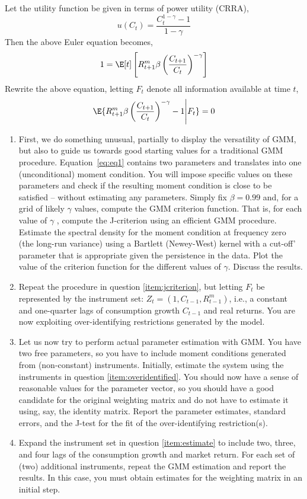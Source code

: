 Let the utility function be given in terms of power utility (CRRA),
\[
    u(C_t) = \frac{C_t^{1-\gamma}-1}{1-\gamma}    
\]
Then the above Euler equation becomes,
\[
    1 = \E[t]\left[R^m_{t+1}\beta\left(\frac{C_{t+1}}{C_t}\right)^{-\gamma}\right]
\]
Rewrite the above equation, letting \(F_t\) denote all information available at time \(t\),
\begin{equation}
    \label{eq:eq1}
    \E{R^m_{t+1}\beta\left(\frac{C_{t+1}}{C_t}\right)^{-\gamma}-1 \Bigg\vert F_t} = 0
\end{equation}
\begin{enumerate}[label = \Alph*)]
    \item \label{item:jcriterion} First, we do something unusual, partially to display the versatility of GMM, but also to guide us towards good starting values for a traditional GMM procedure. Equation~\ref{eq:eq1} contains two parameters and translates into one (unconditional) moment condition. You will impose speciﬁc values on these parameters and check if the resulting moment condition is close to be satisﬁed – without estimating any parameters. Simply ﬁx \(\beta = 0.99\) and, for a grid of likely \(\gamma\) values, compute the GMM criterion function. That is, for each value of \(\gamma\) , compute the J-criterion using an eﬃcient GMM procedure. Estimate the spectral density for the moment condition at frequency zero (the long-run variance) using a Bartlett (Newey-West) kernel with a cut-off' parameter that is appropriate given the persistence in the data. Plot the value of the criterion function for the diﬀerent values of \(\gamma\). Discuss the results.
    \item \label{item:overidentified} Repeat the procedure in question \ref{item:jcriterion}, but letting \(F_t\) be represented by the instrument set: \(Z_t = \left(1, C_{t-1}, R^m_{t-1}\right)\), i.e., a constant and one-quarter lags of consumption growth \(C_{t-1}\)  and real returns. You are now exploiting over-identifying restrictions generated by the model.
    \item \label{item:estimate} Let us now try to perform actual parameter estimation with GMM. You have two free parameters, so you have to include moment conditions generated from (non-constant) instruments. Initially, estimate the system using the instruments in question \ref{item:overidentified}. You should now have a sense of reasonable values for the parameter vector, so you should have a good candidate for the original weighting matrix and do not have to estimate it using, say, the identity matrix. Report the parameter estimates, standard errors, and the J-test for the ﬁt of the over-identifying restriction(s).
    \item Expand the instrument set in question \ref{item:estimate} to include two, three, and four lags of the consumption growth and market return. For each set of (two) additional instruments, repeat the GMM estimation and report the results. In this case, you must obtain estimates for the weighting matrix in an initial step.
\end{enumerate}
